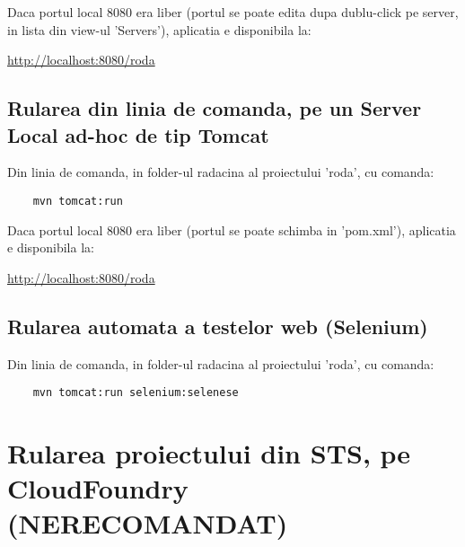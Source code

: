 Daca portul local 8080 era liber (portul se poate edita dupa dublu-click pe
server, in lista din view-ul 'Servers'), aplicatia e disponibila la:

\url{http://localhost:8080/roda}

\subsection{Rularea din linia de comanda, pe un Server Local ad-hoc de tip
Tomcat}
Din linia de comanda, in folder-ul radacina al proiectului 'roda', cu comanda:
\begin{lstlisting}
	mvn tomcat:run
\end{lstlisting}
Daca portul local 8080 era liber (portul se poate schimba in 'pom.xml'),
aplicatia e disponibila la:

\url{http://localhost:8080/roda}

\subsection{Rularea automata a testelor web (Selenium)}
Din linia de comanda, in folder-ul radacina al proiectului 'roda', cu comanda:
\begin{lstlisting}
	mvn tomcat:run selenium:selenese
\end{lstlisting}

\section{Rularea proiectului din STS, pe CloudFoundry (NERECOMANDAT)}

